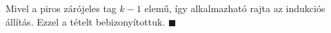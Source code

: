 \documentclass[a4paper,11.5pt]{article}
\begin{document}
\begin{theorem}
		\noindent Mivel a piros zárójeles tag $k-1$ elemű, így alkalmazható rajta az indukciós állítás. Ezzel a tételt bebizonyítottuk. $\blacksquare$
	\end{theorem}
	
	
\end{document}
